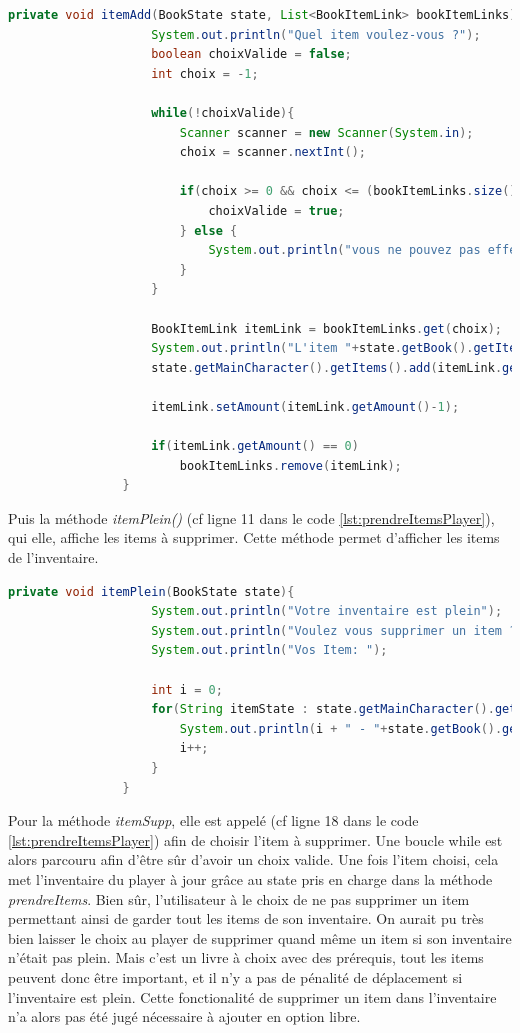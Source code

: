 			\begin{lstlisting}[gobble=16, language=java, caption=itemAdd()]
				private void itemAdd(BookState state, List<BookItemLink> bookItemLinks){
					System.out.println("Quel item voulez-vous ?");
					boolean choixValide = false;
					int choix = -1;

					while(!choixValide){
						Scanner scanner = new Scanner(System.in);
						choix = scanner.nextInt();

						if(choix >= 0 && choix <= (bookItemLinks.size()-1)){
							choixValide = true;
						} else {
							System.out.println("vous ne pouvez pas effectuer ce choix");
						}
					}

					BookItemLink itemLink = bookItemLinks.get(choix);
					System.out.println("L'item "+state.getBook().getItems().get(itemLink.getId()).getName()+" a été rajouté");
					state.getMainCharacter().getItems().add(itemLink.getId());

					itemLink.setAmount(itemLink.getAmount()-1);

					if(itemLink.getAmount() == 0)
						bookItemLinks.remove(itemLink);
				}

			\end{lstlisting}

			Puis la méthode \textit{itemPlein()} (cf ligne 11 dans le code \ref{lst:prendreItemsPlayer}), qui elle, affiche les items à supprimer. Cette méthode permet d'afficher les items de l'inventaire.

			\begin{lstlisting}[gobble=16, language=java, caption=itemPlein()]
				private void itemPlein(BookState state){
					System.out.println("Votre inventaire est plein");
					System.out.println("Voulez vous supprimer un item ?");
					System.out.println("Vos Item: ");

					int i = 0;
					for(String itemState : state.getMainCharacter().getItems()){
						System.out.println(i + " - "+state.getBook().getItems().get(itemState));
						i++;
					}
				}
			\end{lstlisting}

			Pour la méthode \textit{itemSupp}, elle est appelé (cf ligne 18 dans le code \ref{lst:prendreItemsPlayer}) afin de choisir l'item à supprimer. Une boucle while est alors parcouru afin d'être sûr d'avoir un choix valide. Une fois l'item choisi, cela met l'inventaire du player à jour grâce au state pris en charge dans la méthode \textit{prendreItems}. Bien sûr, l'utilisateur à le choix de ne pas supprimer un item permettant ainsi de garder tout les items de son inventaire.
			On aurait pu très bien laisser le choix au player de supprimer quand même un item si son inventaire n'était pas plein. Mais c'est un livre à choix avec des prérequis, tout les items peuvent donc être important, et il n'y a pas de pénalité de déplacement si l'inventaire est plein. Cette fonctionalité de supprimer un item dans l'inventaire n'a alors pas été jugé nécessaire à ajouter en option libre.

